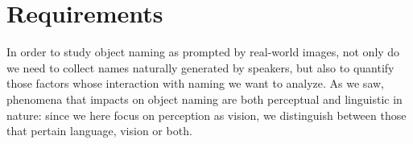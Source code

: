 

%

\section{Requirements}
\label{sec:requirements}
In order to study object naming as prompted by real-world images, not only do we need to collect names naturally generated by speakers, but also to quantify those factors whose interaction with naming we want to analyze. As we saw, phenomena that impacts on object naming are both perceptual and linguistic in nature: since we here focus on perception as vision, we distinguish between those that pertain language, vision or both.

